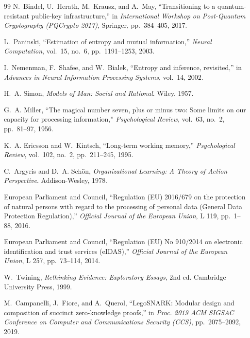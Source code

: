 \documentclass{ieeeaccess}
\begin{document}
\begin{thebibliography}{99}
N.~Bindel, U.~Herath, M.~Krausz, and A.~May, ``Transitioning to a quantum-resistant
public-key infrastructure,'' in \emph{International Workshop on Post-Quantum
Cryptography (PQCrypto 2017)}, Springer, pp.~384--405, 2017.

L.~Paninski, ``Estimation of entropy and mutual information,''
\emph{Neural Computation}, vol.~15, no.~6, pp.~1191--1253, 2003.

I.~Nemenman, F.~Shafee, and W.~Bialek, ``Entropy and inference,
revisited,'' in \emph{Advances in Neural Information Processing
Systems}, vol.~14, 2002.

H.~A. Simon, \emph{Models of Man: Social and Rational}. Wiley, 1957.

G.~A. Miller, ``The magical number seven, plus or minus two: Some limits on our
capacity for processing information,'' \emph{Psychological Review}, vol.~63, no.~2,
pp.~81--97, 1956.

K.~A. Ericsson and W.~Kintsch, ``Long-term working memory,''
\emph{Psychological Review}, vol.~102, no.~2, pp.~211--245, 1995.

C.~Argyris and D.~A. Schön, \emph{Organizational Learning: A Theory of Action Perspective}.
Addison-Wesley, 1978.

European Parliament and Council, ``Regulation (EU) 2016/679 on the protection of
natural persons with regard to the processing of personal data (General Data
Protection Regulation),'' \emph{Official Journal of the European Union}, L 119,
pp.~1--88, 2016.

European Parliament and Council, ``Regulation (EU) No 910/2014 on electronic
identification and trust services (eIDAS),'' \emph{Official Journal of the European Union},
L 257, pp.~73--114, 2014.

W.~Twining, \emph{Rethinking Evidence: Exploratory Essays}, 2nd ed. Cambridge
University Press, 1999.

M.~Campanelli, J.~Fiore, and A.~Querol, ``LegoSNARK: Modular design and composition
of succinct zero-knowledge proofs,'' in \emph{Proc. 2019 ACM SIGSAC Conference on
Computer and Communications Security (CCS)}, pp.~2075--2092, 2019.


\end{thebibliography}
\end{document}
